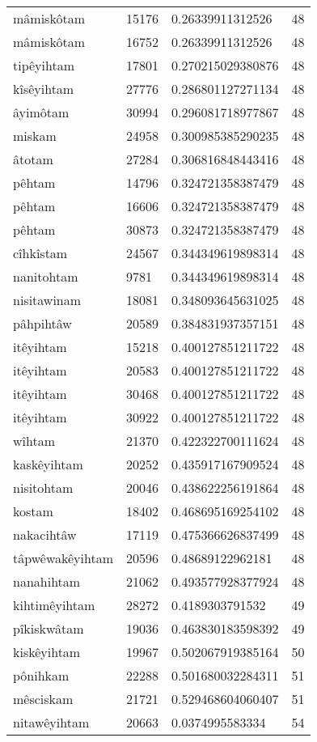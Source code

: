 \begin{longtable}{llll}
mâmiskôtam & 15176 & 0.26339911312526 & 48 \\
mâmiskôtam & 16752 & 0.26339911312526 & 48 \\
tipêyihtam & 17801 & 0.270215029380876 & 48 \\
kîsêyihtam & 27776 & 0.286801127271134 & 48 \\
âyimôtam & 30994 & 0.296081718977867 & 48 \\
miskam & 24958 & 0.300985385290235 & 48 \\
âtotam & 27284 & 0.306816848443416 & 48 \\
pêhtam & 14796 & 0.324721358387479 & 48 \\
pêhtam & 16606 & 0.324721358387479 & 48 \\
pêhtam & 30873 & 0.324721358387479 & 48 \\
cîhkîstam & 24567 & 0.344349619898314 & 48 \\
nanitohtam & 9781 & 0.344349619898314 & 48 \\
nisitawinam & 18081 & 0.348093645631025 & 48 \\
pâhpihtâw & 20589 & 0.384831937357151 & 48 \\
itêyihtam & 15218 & 0.400127851211722 & 48 \\
itêyihtam & 20583 & 0.400127851211722 & 48 \\
itêyihtam & 30468 & 0.400127851211722 & 48 \\
itêyihtam & 30922 & 0.400127851211722 & 48 \\
wîhtam & 21370 & 0.422322700111624 & 48 \\
kaskêyihtam & 20252 & 0.435917167909524 & 48 \\
nisitohtam & 20046 & 0.438622256191864 & 48 \\
kostam & 18402 & 0.468695169254102 & 48 \\
nakacihtâw & 17119 & 0.475366626837499 & 48 \\
tâpwêwakêyihtam & 20596 & 0.48689122962181 & 48 \\
nanahihtam & 21062 & 0.493577928377924 & 48 \\
kihtimêyihtam & 28272 & 0.4189303791532 & 49 \\
pîkiskwâtam & 19036 & 0.463830183598392 & 49 \\
kiskêyihtam & 19967 & 0.502067919385164 & 50 \\
pônihkam & 22288 & 0.501680032284311 & 51 \\
mêsciskam & 21721 & 0.529468604060407 & 51 \\
nitawêyihtam & 20663 & 0.0374995583334 & 54 \\

\end{longtable}
